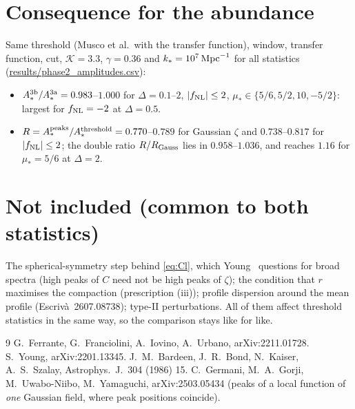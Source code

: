 \documentclass[11pt]{article}
\begin{document}
\section{Consequence for the abundance}\label{sec:consequence}

Same threshold (Musco et al.\ with the transfer function), window, transfer function, cut,
$\mathcal K=3.3$, $\gamma=0.36$ and $k_*=10^7\,{\rm Mpc}^{-1}$ for all statistics
(\url{results/phase2_amplitudes.csv}):
\begin{itemize}
\item $A^{\rm 3b}_*/A^{\rm 3a}_*=0.983$--$1.000$ for $\Delta=0.1$--$2$, $|f_{\rm NL}|\le2$,
$\mu_*\in\{5/6,5/2,10,-5/2\}$: largest for $f_{\rm NL}=-2$ at $\Delta=0.5$.
\item $R=A^{\rm peaks}_*/A^{\rm threshold}_*=0.770$--$0.789$ for Gaussian $\zeta$ and $0.738$--$0.817$
for $|f_{\rm NL}|\le2$; the double ratio $R/R_{\rm Gauss}$ lies in $0.958$--$1.036$, and reaches
$1.16$ for $\mu_*=5/6$ at $\Delta=2$.
\end{itemize}

\section{Not included (common to both statistics)}

The spherical-symmetry step behind \eqref{eq:Cl}, which Young~\cite{Young} questions for broad
spectra (high peaks of $C$ need not be high peaks of $\zeta$); the condition that $r$ maximises
the compaction (prescription (iii)); profile dispersion around the mean profile
(Escriv\`a~2607.08738); type-II perturbations. All of them affect threshold statistics in the
same way, so the comparison stays like for like.

\begin{thebibliography}{9}
 G.~Ferrante, G.~Franciolini, A.~Iovino, A.~Urbano, arXiv:2211.01728.
 S.~Young, arXiv:2201.13345.
 J.~M.~Bardeen, J.~R.~Bond, N.~Kaiser, A.~S.~Szalay, Astrophys.\ J.\ 304 (1986) 15.
 C.~Germani, M.~A.~Gorji, M.~Uwabo-Niibo, M.~Yamaguchi, arXiv:2503.05434 (peaks of
a local function of \emph{one} Gaussian field, where peak positions coincide).
\end{thebibliography}
\end{document}
